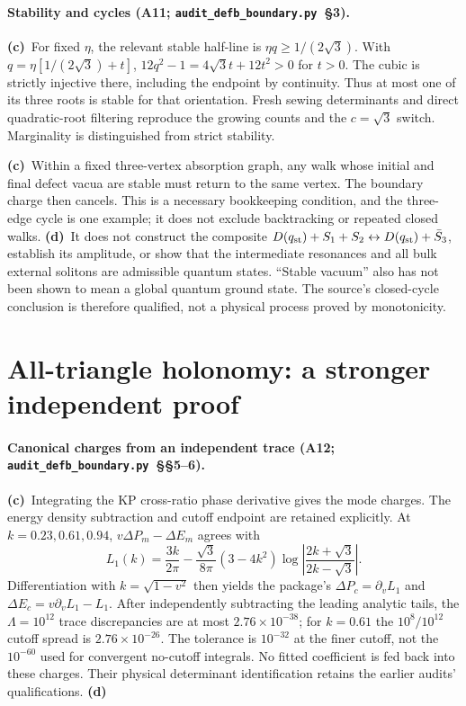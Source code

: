 \documentclass[11pt,a4paper]{article}
\newcommand{\Lc}{\textbf{(c)}\ }
\newcommand{\Ld}{\textbf{(d)}\ }
\newcommand{\scr}{\texttt{audit\_\allowbreak defb\_\allowbreak boundary.py}}
\begin{document}
\paragraph{Stability and cycles (A11; \scr\ §3).}
\Lc For fixed $\eta$, the relevant stable half-line is
$\eta q\ge1/(2\sqrt3)$. With $q=\eta[1/(2\sqrt3)+t]$,
$12q^2-1=4\sqrt3t+12t^2>0$ for $t>0$. The cubic is strictly injective
there, including the endpoint by continuity. Thus at most one of its
three roots is stable for that orientation. Fresh sewing determinants
and direct quadratic-root filtering reproduce the growing counts and the
$c=\sqrt3$ switch. Marginality is distinguished from strict stability.

\Lc Within a fixed three-vertex absorption graph, any walk whose initial
and final defect vacua are stable must return to the same vertex. The
boundary charge then cancels. This is a necessary bookkeeping condition,
and the three-edge cycle is one example; it does not exclude backtracking
or repeated closed walks. \Ld It does not construct the composite
$D(q_{\rm st})+S_1+S_2\leftrightarrow D(q_{\rm st})+\bar S_3$, establish
its amplitude, or show that the intermediate resonances and all bulk
external solitons are admissible quantum states. ``Stable vacuum'' also
has not been shown to mean a global quantum ground state. The source's
closed-cycle conclusion is therefore qualified, not a physical process
proved by monotonicity.

\section{All-triangle holonomy: a stronger independent proof}
\paragraph{Canonical charges from an independent trace (A12; \scr\ §§5--6).}
\Lc Integrating the KP cross-ratio phase derivative gives the mode charges.
The energy density subtraction and cutoff endpoint are retained explicitly.
At $k=0.23,0.61,0.94$, $v\Delta P_m-\Delta E_m$ agrees with
\begin{equation}
 L_1(k)=\frac{3k}{2\pi}-\frac{\sqrt3}{8\pi}(3-4k^2)
       \log\left|\frac{2k+\sqrt3}{2k-\sqrt3}\right|.
\end{equation}
Differentiation with $k=\sqrt{1-v^2}$ then yields the package's
$\Delta P_c=\partial_vL_1$ and $\Delta E_c=v\partial_vL_1-L_1$.
After independently subtracting the leading analytic tails, the
$\Lambda=10^{12}$ trace discrepancies are at most $2.76\times10^{-38}$;
for $k=0.61$ the $10^8/10^{12}$ cutoff spread is
$2.76\times10^{-26}$. The tolerance is $10^{-32}$ at the finer cutoff,
not the $10^{-60}$ used for convergent no-cutoff integrals. No fitted
coefficient is fed back into these charges. Their physical determinant
identification retains the earlier audits' qualifications. \Ld
\end{document}
